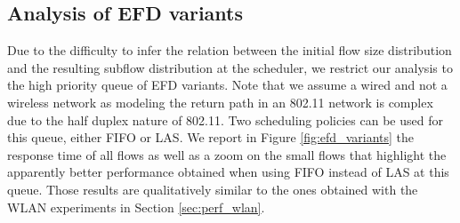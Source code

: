 \documentclass[preprint,12pt]{elsarticle}
\begin{document}
%
 
\subsection{Analysis of EFD variants}

Due to the difficulty to infer the relation between the initial flow size distribution and the resulting subflow distribution at the scheduler, we restrict our analysis to the high priority queue of  EFD variants. Note that we assume a wired and not a wireless network as modeling the return path in an 802.11 network is complex due to the half duplex nature of 802.11. Two scheduling policies can be used for this queue, either FIFO or LAS.  We report in Figure \ref{fig:efd_variants} the response time of all flows as well as a zoom on the small flows that highlight the apparently better performance obtained when using FIFO instead of LAS at this queue. Those results are qualitatively similar to the ones obtained with the WLAN experiments in Section \ref{sec:perf_wlan}.
\end{document}
